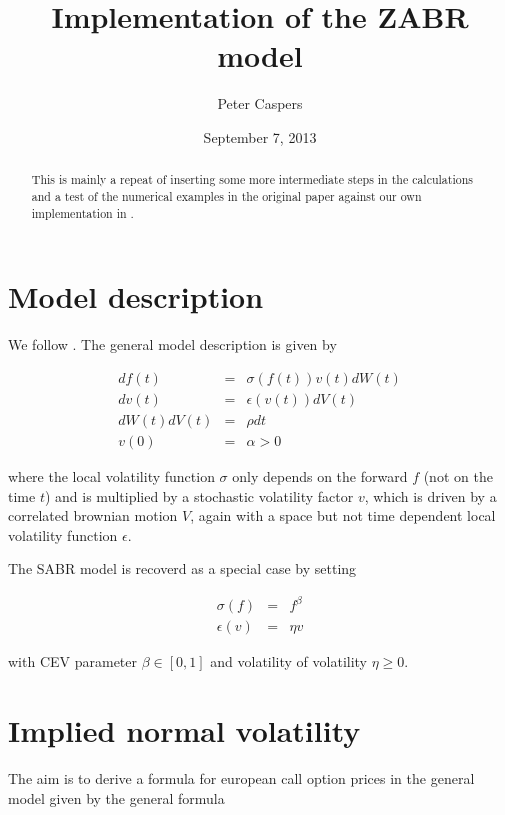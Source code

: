 \documentclass{amsart}
\theoremstyle{plain}
\numberwithin{equation}{section}
\begin{document}
\title{Implementation of the ZABR model}
\author{Peter Caspers}
\date{September 7, 2013}
\maketitle

\begin{abstract}
This is mainly a repeat of \cite{zabr} inserting some more intermediate steps in 
the calculations and a test of the numerical examples in the original paper against 
our own implementation
in \cite{ql}.
\end{abstract}

\section{Model description}
We follow \cite{zabr}. The general model description is given by

\begin{eqnarray}\label{generalmodeldef}
df(t) &=& \sigma(f(t)) v(t) dW(t) \\
dv(t) &=& \epsilon(v(t)) dV(t) \\
dW(t) dV(t) &=& \rho dt \\
v(0) &=& \alpha > 0
\end{eqnarray}

where the local volatility function $\sigma$ only depends on the forward $f$ (not on the time $t$) and is multiplied by a
stochastic volatility factor $v$, which is driven by a correlated brownian motion $V$, again with a space but not time dependent local volatility function $\epsilon$.

The SABR model is recoverd as a special case by setting

\begin{eqnarray}
\sigma(f) &=& f^{\beta} \\
\epsilon(v) &=& \eta v
\end{eqnarray}

with CEV parameter $\beta \in [0,1]$ and volatility of volatility $\eta \geq 0$.

\section{Implied normal volatility}

The aim is to derive a formula for european call option prices in the general model given by the general formula
\end{document}
